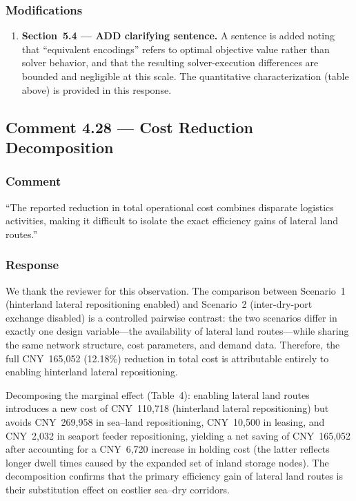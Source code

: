 \documentclass[11pt,a4paper]{article}
\begin{document}
\subsubsection{Modifications}
\begin{enumerate}
\item \textbf{Section~5.4 --- ADD clarifying sentence.} A sentence is added noting that ``equivalent encodings'' refers to optimal objective value rather than solver behavior, and that the resulting solver-execution differences are bounded and negligible at this scale. The quantitative characterization (table above) is provided in this response.
\end{enumerate}

\subsection{Comment 4.28 --- Cost Reduction Decomposition}

\subsubsection{Comment}
``The reported reduction in total operational cost combines disparate logistics activities, making it difficult to isolate the exact efficiency gains of lateral land routes.''

\subsubsection{Response}
We thank the reviewer for this observation. The comparison between Scenario~1 (hinterland lateral repositioning enabled) and Scenario~2 (inter-dry-port exchange disabled) is a controlled pairwise contrast: the two scenarios differ in exactly one design variable---the availability of lateral land routes---while sharing the same network structure, cost parameters, and demand data. Therefore, the full CNY~165,052 (12.18\%) reduction in total cost is attributable entirely to enabling hinterland lateral repositioning.

Decomposing the marginal effect (Table~4): enabling lateral land routes introduces a new cost of CNY~110,718 (hinterland lateral repositioning) but avoids CNY~269,958 in sea--land repositioning, CNY~10,500 in leasing, and CNY~2,032 in seaport feeder repositioning, yielding a net saving of CNY~165,052 after accounting for a CNY~6,720 increase in holding cost (the latter reflects longer dwell times caused by the expanded set of inland storage nodes). The decomposition confirms that the primary efficiency gain of lateral land routes is their substitution effect on costlier sea--dry corridors.
\end{document}
